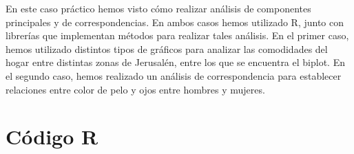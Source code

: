 \documentclass[12pt,a4paper,twoside,openright,titlepage,final]{article}
\begin{document}
En este caso práctico hemos visto cómo realizar análisis de componentes principales y de correspondencias. En ambos casos hemos utilizado R, junto con librerías que implementan métodos para realizar tales análisis. En el primer caso, hemos utilizado distintos tipos de gráficos para analizar las comodidades del hogar entre distintas zonas de Jerusalén, entre los que se encuentra el biplot. En el segundo caso, hemos realizado un análisis de correspondencia para establecer relaciones entre color de pelo y ojos entre hombres y mujeres. 

\clearpage

\section{Código R}


\end{document}
